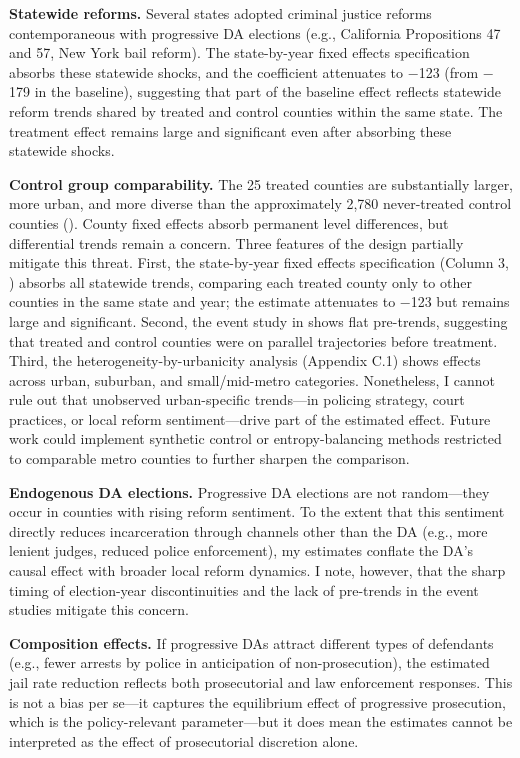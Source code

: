 \documentclass[12pt]{article}
\begin{document}
\textbf{Statewide reforms.} Several states adopted criminal justice reforms contemporaneous with progressive DA elections (e.g., California Propositions 47 and 57, New York bail reform). The state-by-year fixed effects specification absorbs these statewide shocks, and the coefficient attenuates to $-$123 (from $-$179 in the baseline), suggesting that part of the baseline effect reflects statewide reform trends shared by treated and control counties within the same state. The treatment effect remains large and significant even after absorbing these statewide shocks.

\textbf{Control group comparability.} The 25 treated counties are substantially larger, more urban, and more diverse than the approximately 2,780 never-treated control counties (). County fixed effects absorb permanent level differences, but differential trends remain a concern. Three features of the design partially mitigate this threat. First, the state-by-year fixed effects specification (Column 3, ) absorbs all statewide trends, comparing each treated county only to other counties in the same state and year; the estimate attenuates to $-$123 but remains large and significant. Second, the event study in  shows flat pre-trends, suggesting that treated and control counties were on parallel trajectories before treatment. Third, the heterogeneity-by-urbanicity analysis (Appendix C.1) shows effects across urban, suburban, and small/mid-metro categories. Nonetheless, I cannot rule out that unobserved urban-specific trends---in policing strategy, court practices, or local reform sentiment---drive part of the estimated effect. Future work could implement synthetic control or entropy-balancing methods restricted to comparable metro counties to further sharpen the comparison.

\textbf{Endogenous DA elections.} Progressive DA elections are not random---they occur in counties with rising reform sentiment. To the extent that this sentiment directly reduces incarceration through channels other than the DA (e.g., more lenient judges, reduced police enforcement), my estimates conflate the DA's causal effect with broader local reform dynamics. I note, however, that the sharp timing of election-year discontinuities and the lack of pre-trends in the event studies mitigate this concern.

\textbf{Composition effects.} If progressive DAs attract different types of defendants (e.g., fewer arrests by police in anticipation of non-prosecution), the estimated jail rate reduction reflects both prosecutorial and law enforcement responses. This is not a bias per se---it captures the equilibrium effect of progressive prosecution, which is the policy-relevant parameter---but it does mean the estimates cannot be interpreted as the effect of prosecutorial discretion alone.
\end{document}
